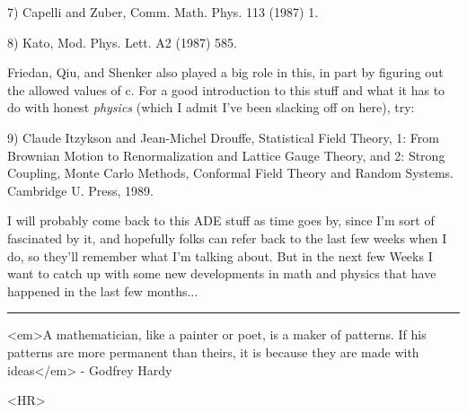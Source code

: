 7) Capelli and Zuber, Comm. Math. Phys. 113 (1987) 1.

8) Kato, Mod. Phys. Lett. A2 (1987) 585.

Friedan, Qiu, and Shenker also played a big role in this, in part by
figuring out the allowed values of c.  For a good introduction to this
stuff and what it has to do with honest \emph{physics} (which I admit I've been
slacking off on here), try:

9) Claude Itzykson and Jean-Michel Drouffe, Statistical Field Theory, 
1: From Brownian Motion to Renormalization and Lattice Gauge Theory, and
2: Strong Coupling, Monte Carlo Methods, Conformal Field Theory and
Random Systems.  Cambridge U. Press, 1989. 

I will probably come back to this ADE stuff as time goes by, since
I'm sort of fascinated by it, and hopefully folks can refer back to
the last few weeks when I do, so they'll remember what I'm talking
about.  But in the next few Weeks I want to catch up with some new
developments in math and physics that have happened in the last few
months... 

\par\noindent\rule{\textwidth}{0.4pt}
<em>A mathematician, like a painter or poet, is a maker of
patterns.  If his patterns are more permanent than theirs, it is because
they are made with ideas</em> - Godfrey Hardy


<HR>



